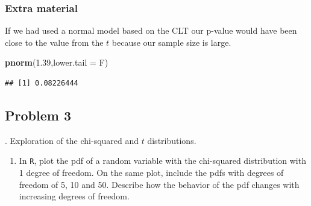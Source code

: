 \documentclass[
]{book}
\newenvironment{Shaded}{\begin{snugshade}}{\end{snugshade}}
\newcommand{\DataTypeTok}[1]{\textcolor[rgb]{0.13,0.29,0.53}{#1}}
\newcommand{\DecValTok}[1]{\textcolor[rgb]{0.00,0.00,0.81}{#1}}
\newcommand{\FloatTok}[1]{\textcolor[rgb]{0.00,0.00,0.81}{#1}}
\newcommand{\KeywordTok}[1]{\textcolor[rgb]{0.13,0.29,0.53}{\textbf{#1}}}
\newcommand{\NormalTok}[1]{#1}
\newcommand{\OperatorTok}[1]{\textcolor[rgb]{0.81,0.36,0.00}{\textbf{#1}}}
\newcommand{\StringTok}[1]{\textcolor[rgb]{0.31,0.60,0.02}{#1}}
\providecommand{\tightlist}{%
  \setlength{\itemsep}{0pt}\setlength{\parskip}{0pt}}
\begin{document}
\hypertarget{extra-material}{%
\subsubsection{Extra material}\label{extra-material}}

If we had used a normal model based on the CLT our p-value would have been close to the value from the \(t\) because our sample size is large.

\begin{Shaded}
\begin{Highlighting}[]
\KeywordTok{pnorm}\NormalTok{(}\FloatTok{1.39}\NormalTok{,}\DataTypeTok{lower.tail =}\NormalTok{ F)}
\end{Highlighting}
\end{Shaded}

\begin{verbatim}
## [1] 0.08226444
\end{verbatim}

\hypertarget{problem-3-14}{%
\subsection{Problem 3}\label{problem-3-14}}

. Exploration of the chi-squared and \(t\) distributions.

\begin{enumerate}
\def\labelenumi{\alph{enumi}.}
\tightlist
\item
  In \texttt{R}, plot the pdf of a random variable with the chi-squared distribution with 1 degree of freedom. On the same plot, include the pdfs with degrees of freedom of 5, 10 and 50. Describe how the behavior of the pdf changes with increasing degrees of freedom.
\end{enumerate}

\begin{Shaded}
\end{Shaded}
\end{document}
